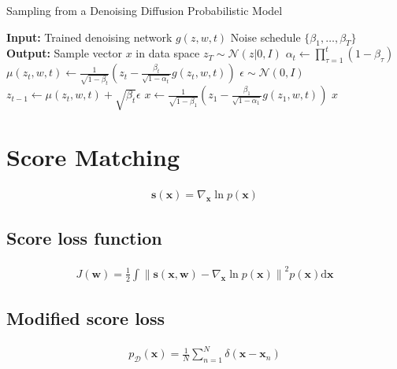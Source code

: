 \documentclass{article}
\begin{document}
\begin{algorithm}[H]
\caption{Sampling from a Denoising Diffusion Probabilistic Model}
\begin{algorithmic}[1]
\STATE \textbf{Input:} Trained denoising network $g(z, w, t)$
\STATE \quad Noise schedule $\{\beta_1, \ldots, \beta_T\}$
\STATE \textbf{Output:} Sample vector $x$ in data space
\STATE $z_T \sim \mathcal{N}(z|0, I)$ 
    \STATE $\alpha_t \gets \prod_{\tau=1}^{t} (1 - \beta_\tau)$ 
    \STATE $\mu(z_t, w, t) \gets \frac{1}{\sqrt{1 - \beta_t}} \left(z_t - \frac{\beta_t}{\sqrt{1 - \alpha_t}} g(z_t, w, t)\right)$ 
    \STATE $\epsilon \sim \mathcal{N}(0, I)$ 
    \STATE $z_{t-1} \gets \mu(z_t, w, t) + \sqrt{\beta_t} \epsilon$ 
\ENDFOR
\STATE $x \gets \frac{1}{\sqrt{1 - \beta_1}} \left(z_1 - \frac{\beta_1}{\sqrt{1 - \alpha_1}} g(z_1, w, t)\right)$ 
\RETURN $x$
\end{algorithmic}
\end{algorithm}

\section{Score Matching}

\begin{align*}
\mathbf{s}(\mathbf{x})=\nabla_{\mathbf{x}} \ln p(\mathbf{x}) 
\tag{20.42}
\end{align*}

\subsection{Score loss function}

\begin{align*}
J(\mathbf{w})=\frac{1}{2} \int\left\|\mathbf{s}(\mathbf{x}, \mathbf{w})-\nabla_{\mathbf{x}} \ln p(\mathbf{x})\right\|^{2} p(\mathbf{x}) \mathrm{d} \mathbf{x} 
\tag{20.43}
\end{align*}

\subsection{Modified score loss}

\begin{align*}
p_{\mathcal{D}}(\mathbf{x})=\frac{1}{N} \sum_{n=1}^{N} \delta\left(\mathbf{x}-\mathbf{x}_{n}\right) 
\tag{20.44}
\end{align*}
\end{document}
